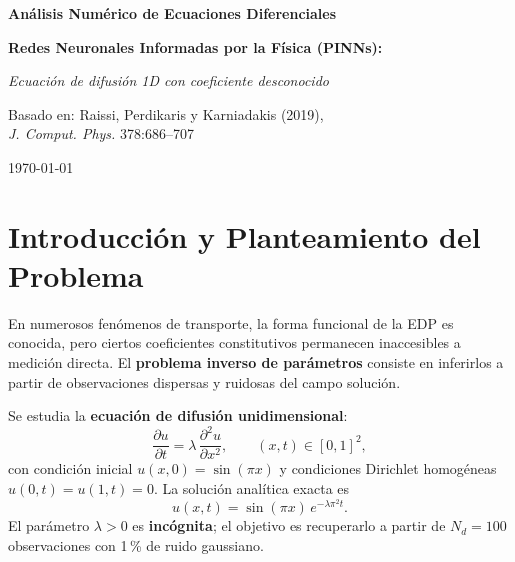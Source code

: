 \documentclass[12pt,a4paper]{article}
\begin{document}
\begin{titlepage}
  \centering\vspace*{2cm}
  {\Large\textbf{Análisis Numérico de Ecuaciones Diferenciales}\par}
  \vspace{0.5cm}{\large Proyecto Final\par}\vspace{2cm}
  {\LARGE\textbf{Redes Neuronales Informadas por la Física (PINNs):}\par}
  \vspace{0.5cm}{\large Pista B\par}\vspace{3cm}
  {\large\textit{Ecuación de difusión 1D con coeficiente desconocido}\par}
  \vspace{3cm}
  {\normalsize Basado en: Raissi, Perdikaris y Karniadakis (2019),\\
  \textit{J. Comput. Phys.} 378:686--707\par}
  \vfill{\normalsize\today\par}
\end{titlepage}

\tableofcontents\newpage

\section{Introducción y Planteamiento del Problema}

En numerosos fenómenos de transporte, la forma funcional de la EDP es conocida, pero
ciertos coeficientes constitutivos permanecen inaccesibles a medición directa. El
\textbf{problema inverso de parámetros} consiste en inferirlos a partir de observaciones
dispersas y ruidosas del campo solución.

Se estudia la \textbf{ecuación de difusión unidimensional}:
\begin{equation}
  \frac{\partial u}{\partial t}=\lambda\,\frac{\partial^2 u}{\partial x^2},\qquad
  (x,t)\in[0,1]^2,\label{eq:difusion}
\end{equation}
con condición inicial $u(x,0)=\sin(\pi x)$ y condiciones Dirichlet homogéneas
$u(0,t)=u(1,t)=0$. La solución analítica exacta es
\begin{equation}
  u(x,t)=\sin(\pi x)\,e^{-\lambda\pi^2 t}.\label{eq:analitica}
\end{equation}
El parámetro $\lambda>0$ es \textbf{incógnita}; el objetivo es recuperarlo a partir de
$N_d=100$ observaciones con 1\,\% de ruido gaussiano.
\end{document}
